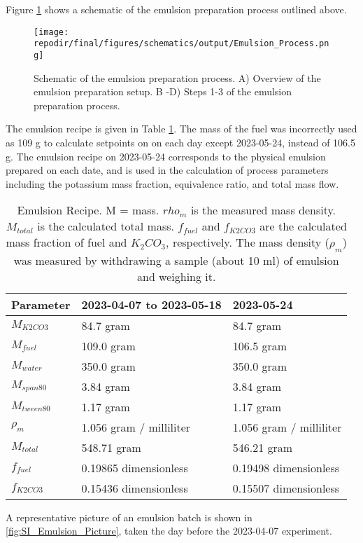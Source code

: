 Figure \ref{fig:SI_Emulsion_Process} shows a schematic of the emulsion preparation process outlined above. 


\begin{figure}[]
\centering
\texttt{[image: \\repodir/final/figures/schematics/output/Emulsion\_Process.png]}
\caption{Schematic of the emulsion preparation process. A) Overview of the emulsion preparation setup. B -D) Steps 1-3 of the emulsion preparation process.}
\label{fig:SI_Emulsion_Process}
\end{figure}


The emulsion recipe is given in Table \ref{tab:emulsion_parameters}. The mass of the fuel was incorrectly used as 109 g to calculate setpoints on on each day except 2023-05-24, instead of 106.5 g. The emulsion recipe on 2023-05-24 corresponds to the physical emulsion prepared on each date, and is used in the calculation of process parameters including the potassium mass fraction, equivalence ratio, and total mass flow. 


\begin{table}[h]
\centering
\begin{tabular}{|l|l|l|}
\hline
\textbf{Parameter} & \textbf{2023-04-07 to 2023-05-18} & \textbf{2023-05-24} \\
\hline
$M_{K2CO3}$ & 84.7 gram & 84.7 gram \\
$M_{fuel}$ & 109.0 gram & 106.5 gram \\
$M_{water}$ & 350.0 gram & 350.0 gram \\
$M_{span80}$ & 3.84 gram & 3.84 gram \\
$M_{tween80}$ & 1.17 gram & 1.17 gram \\
$\rho_m$ & 1.056 gram / milliliter & 1.056 gram / milliliter \\
$M_{total}$ & 548.71 gram & 546.21 gram \\
$f_{fuel}$ & 0.19865 dimensionless & 0.19498 dimensionless \\
$f_{K2CO3}$ & 0.15436 dimensionless & 0.15507 dimensionless \\
\hline
\end{tabular}
\caption{Emulsion Recipe. M = mass. $rho_m$ is the measured mass density. $M_{total}$ is the calculated total mass. $f_{fuel}$ and $f_{K2CO3}$ are the calculated mass fraction of fuel and $K_2CO_3$, respectively. The mass density ($\rho_m$) was measured by withdrawing a sample (about 10 ml) of emulsion and weighing it.  }


\label{tab:emulsion_parameters}
\end{table}
A representative picture of an emulsion batch is shown in \ref{fig:SI_Emulsion_Picture}, taken the day before the 2023-04-07 experiment. 

